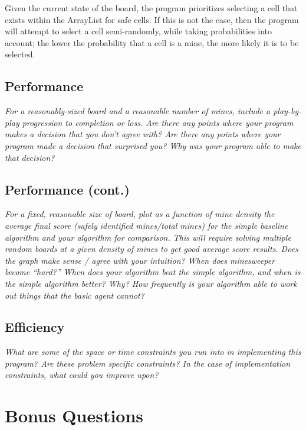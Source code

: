 \documentclass[11pt]{article} %
\begin{document}
Given the current state of the board, the program prioritizes selecting a cell that exists within the ArrayList for safe cells. If this is not the case, then the program will attempt to select a cell semi-randomly, while taking probabilities into account; the lower the probability that a cell is a mine, the more likely it is to be selected.

\subsection{Performance}

\textit{For a reasonably-sized board and a reasonable number of mines, include a play-by-play progression to completion or loss. Are there any points where your program makes a decision that you don’t agree with? Are there any points where your program made a decision that surprised you? Why was your program able to make that decision?}\\

\subsection{Performance (cont.)}

\textit{For a fixed, reasonable size of board, plot as a function of mine density the average final score (safely identified mines/total mines) for the simple baseline algorithm and your algorithm for comparison. This will require solving multiple random boards at a given density of mines to get good average score results. Does the graph make sense / agree with your intuition? When does minesweeper become “hard?” When does your algorithm beat the simple algorithm, and when is the simple algorithm better? Why? How frequently is your algorithm able to work out things that the basic agent cannot?}\\

\subsection{Efficiency}

\textit{What are some of the space or time constraints you run into in implementing this program? Are these problem specific constraints? In the case of implementation constraints, what could you improve upon?}\\

\section{\textbf{Bonus Questions}}
\end{document}
